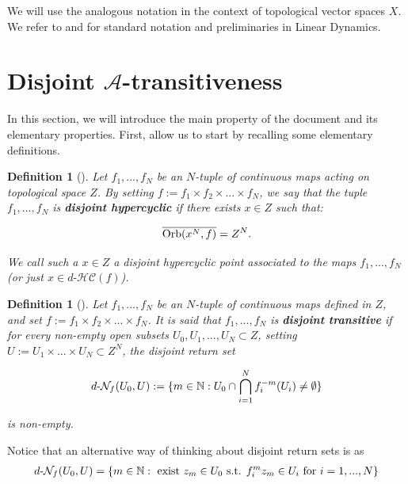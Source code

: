 \documentclass[11pt,reqno]{article}
\newtheorem{definition}[statement]{Definition}
\def\orb{{\rm Orb}}
\def\dhc{d\text{-}\mathcal{HC}}
\def\dret{d\text{-}\ret}
\def\ret{\mathcal{N}}
\def\NN{\Bbb N}
\def\ol{\overline}
\begin{document}
We will use the analogous notation in the context of topological vector spaces $X$. We refer to  \cite{BaMa09} and \cite{GEPe10} for standard notation and preliminaries in Linear Dynamics. 


\section{Disjoint $\mathcal{A}$-transitiveness}\label{sec:disjoint-A-trans}

In this section, we will introduce the main property of the document and its elementary properties. First, allow us to start by recalling some elementary definitions.

\begin{definition}[\cite{BesPeris07}]\label{def:d-hyper-f}
Let $f_1,...,f_N$ be an $N$-tuple of continuous maps acting on topological space $Z$. By setting $f:= f_1 \times f_2 \times ...\times f_N$, we say that the tuple $f_1,...,f_N$ is \textbf{disjoint  hypercyclic} if there exists $x\in Z$ such that:

\begin{equation*}
    \ol{\orb(x^N, f)}= Z^N.
\end{equation*}

We call such a $x\in Z$ a disjoint hypercyclic point associated to the maps $f_1,...,f_N$ (or just $x\in \dhc(f)$). 


\end{definition}


\begin{definition}[\cite{BesPeris07}]
Let $f_1,...,f_N$ be an $N$-tuple of continuous maps defined in $Z$, and set $f:= f_1 \times f_2 \times ...\times f_N$. It is said that $f_1,...,f_N$ is \textbf{disjoint transitive} if for every non-empty open subsets $U_0, U_1, ..., U_N \subset Z$, setting ${U:=U_1 \times...\times U_N\subset Z^N}$, the \textit{disjoint return set}
 
 \[\dret_f(U_0, U):=\{ m \in \NN : U_0\cap \bigcap_{i=1}^N f_{i}^{-m}(U_i)\neq \emptyset\}\]

is non-empty.
\end{definition}

Notice that an alternative way of thinking about disjoint return sets is as
\begin{equation*}\begin{split}
\dret_f(U_0, U) = \{m\in \NN : \text{ exist } z_m\in U_0 \text{ s.t. } f_i^{m}z_m\in U_i \text{ for } i=1,...,N \}
\end{split}
\end{equation*}
\end{document}
